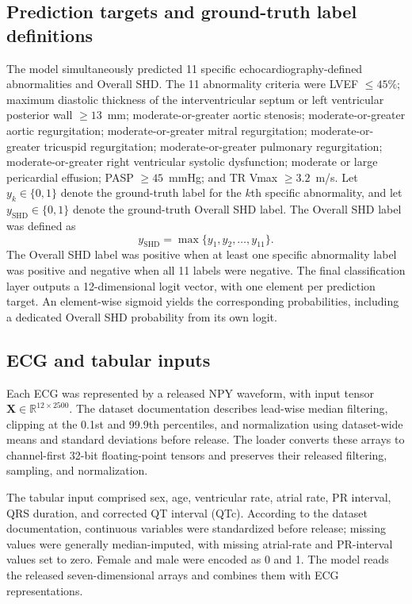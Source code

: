 \subsection{Prediction targets and ground-truth label definitions}
\label{sec:outcomes}

The model simultaneously predicted 11 specific echocardiography-defined abnormalities and Overall SHD\cite{elias2026echonextdata}. The 11 abnormality criteria were LVEF $\leq45\%$; maximum diastolic thickness of the interventricular septum or left ventricular posterior wall $\geq13$~mm; moderate-or-greater aortic stenosis; moderate-or-greater aortic regurgitation; moderate-or-greater mitral regurgitation; moderate-or-greater tricuspid regurgitation; moderate-or-greater pulmonary regurgitation; moderate-or-greater right ventricular systolic dysfunction; moderate or large pericardial effusion; PASP $\geq45$~mmHg; and TR Vmax $\geq3.2$~m/s. Let $y_k\in\{0,1\}$ denote the ground-truth label for the $k$th specific abnormality, and let $y_{\mathrm{SHD}}\in\{0,1\}$ denote the ground-truth Overall SHD label. The Overall SHD label was defined as
\begin{equation}
y_{\mathrm{SHD}}=\max\{y_1,y_2,\ldots,y_{11}\}.
\label{eq:overall_shd}
\end{equation}
The Overall SHD label was positive when at least one specific abnormality label was positive and negative when all 11 labels were negative. The final classification layer outputs a 12-dimensional logit vector, with one element per prediction target. An element-wise sigmoid yields the corresponding probabilities, including a dedicated Overall SHD probability from its own logit.

\subsection{ECG and tabular inputs}
\label{sec:inputs}

Each ECG was represented by a released NPY waveform, with input tensor $\mathbf{X}\in\mathbb{R}^{12\times2500}$. The dataset documentation describes lead-wise median filtering, clipping at the 0.1st and 99.9th percentiles, and normalization using dataset-wide means and standard deviations before release. The loader converts these arrays to channel-first 32-bit floating-point tensors and preserves their released filtering, sampling, and normalization.

The tabular input comprised sex, age, ventricular rate, atrial rate, PR interval, QRS duration, and corrected QT interval (QTc). According to the dataset documentation, continuous variables were standardized before release; missing values were generally median-imputed, with missing atrial-rate and PR-interval values set to zero. Female and male were encoded as 0 and 1. The model reads the released seven-dimensional arrays and combines them with ECG representations.

